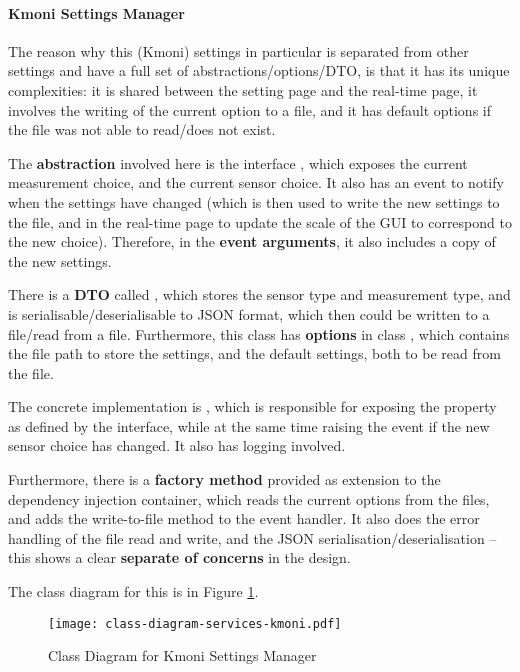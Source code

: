 \paragraph{Kmoni Settings Manager}

The reason why this (Kmoni) settings in particular is separated from other settings and have a full set of abstractions/options/DTO, is that it has its unique complexities: it is shared between the setting page and the real-time page, it involves the writing of the current option to a file, and it has default options if the file was not able to read/does not exist.

The \textbf{abstraction} involved here is the interface , which exposes the current measurement choice, and the current sensor choice. It also has an event to notify when the settings have changed (which is then used to write the new settings to the file, and in the real-time page to update the scale of the GUI to correspond to the new choice). Therefore, in the \textbf{event arguments}, it also includes a copy of the new settings.

There is a \textbf{DTO} called , which stores the sensor type and measurement type, and is serialisable/deserialisable to JSON format, which then could be written to a file/read from a file. Furthermore, this class has \textbf{options} in class , which contains the file path to store the settings, and the default settings, both to be read from the  file.

The concrete implementation is , which is responsible for exposing the property as defined by the interface, while at the same time raising the event if the new sensor choice has changed. It also has logging involved.

Furthermore, there is a \textbf{factory method} provided as extension to the dependency injection container, which reads the current options from the files, and adds the write-to-file method to the event handler. It also does the error handling of the file read and write, and the JSON serialisation/deserialisation -- this shows a clear \textbf{separate of concerns} in the design.

The class diagram for this is in Figure \ref{fig:class-diagram-services-kmoni}.

\begin{figure}[htp]
    \centering
    \texttt{[image: class-diagram-services-kmoni.pdf]}
    \caption{Class Diagram for Kmoni Settings Manager}
    \label{fig:class-diagram-services-kmoni}
\end{figure}

